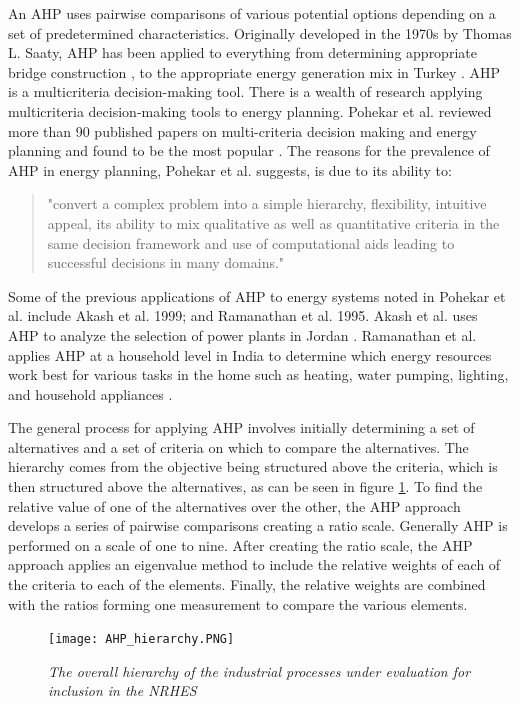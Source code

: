 An AHP uses pairwise comparisons of various potential options depending on a set of predetermined characteristics. Originally developed in the 1970s by Thomas L. Saaty, AHP has been applied to everything from determining appropriate bridge construction \cite{Pan2008}, to the appropriate energy generation mix in Turkey \cite{Kahraman2010, Saaty1987}. AHP is a multicriteria decision-making tool. There is a wealth of research applying multicriteria decision-making tools to energy planning. Pohekar et al. reviewed more than 90 published papers on multi-criteria decision making and energy planning and found \cite{ahp} to be the most popular \cite{Pohekar2004}. The reasons for the prevalence of AHP in energy planning, Pohekar et al. suggests, is due to its ability to:
\begin{quote}
	"convert a complex problem into a simple hierarchy, flexibility, intuitive appeal, its ability to mix qualitative as well as quantitative criteria in the same decision framework and use of computational aids leading to successful decisions in many domains.\cite{Pohekar2004}"
 \end{quote}
Some of the previous applications of AHP to energy systems noted in Pohekar et al. include Akash et al.  1999; and Ramanathan et al. 1995. Akash et al. uses AHP to analyze the selection of power plants in Jordan \cite{Akash1999}.  Ramanathan et al. applies AHP at a household level in India to determine which energy resources work best for various tasks in the home such as heating, water pumping, lighting, and household appliances \cite{Ramanathan1995}.

The general process for applying AHP involves initially determining a set of alternatives and a set of criteria on which to compare the alternatives. The hierarchy comes from the objective being structured above the criteria, which is then structured above the alternatives, as can be seen in figure \ref{AHP_struct}. To find the relative value of one of the alternatives over the other, the AHP approach develops a series of pairwise comparisons creating a ratio scale.  Generally AHP is performed on a scale of one to nine. After creating the ratio scale, the AHP approach applies an eigenvalue method to include the relative weights of each of the criteria to each of  the elements. Finally, the relative weights are combined with the ratios forming one measurement to compare the various elements.

\begin{figure}[h!]
  \centering
  \texttt{[image: AHP\_hierarchy.PNG]}
  \caption{\small \sl The overall hierarchy of the industrial processes under evaluation for inclusion in the NRHES}
  \label{AHP_struct}
\end{figure}


